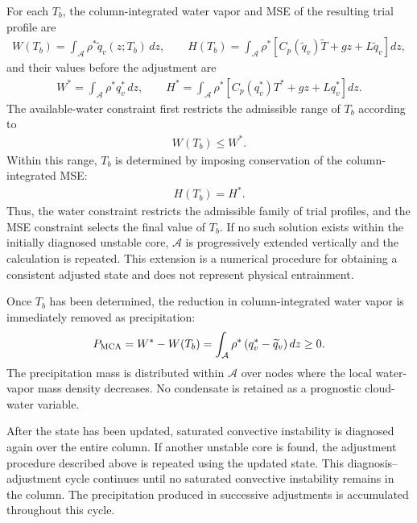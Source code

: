 For each $T_b$, the column-integrated water vapor and MSE of the resulting trial profile are
%
\begin{align*}
 W(T_b)
 =
 \int_{\mathcal{A}} \rho^* \widetilde{q}_v(z;T_b)\,dz ,
 \qquad
 H(T_b)
 =
 \int_{\mathcal{A}} \rho^*
 \left[
 C_p(\widetilde{q}_v)\widetilde{T}
 + gz
 + L\widetilde{q}_v
 \right] dz ,
\end{align*}
%
and their values before the adjustment are
%
\begin{align*}
 W^*
 =
 \int_{\mathcal{A}} \rho^* q_v^*\,dz ,
 \qquad
 H^*
 =
 \int_{\mathcal{A}} \rho^*
 \left[
 C_p(q_v^*)T^*
 + gz
 + Lq_v^*
 \right] dz .
\end{align*}
%
The available-water constraint first restricts the admissible range of $T_b$ according to
%
\begin{align}
 W(T_b) \le W^*.
 \label{eq:mca_water_constraint}
\end{align}
%
Within this range, $T_b$ is determined by imposing conservation of the column-integrated MSE:
%
\begin{align}
 H(T_b) = H^*.
 \label{eq:mca_energy_constraint}
\end{align}
%
Thus, the water constraint restricts the admissible family of trial profiles, and the MSE constraint selects the final value of $T_b$.
If no such solution exists within the initially diagnosed unstable core, $\mathcal{A}$ is progressively extended vertically and the calculation is repeated.
This extension is a numerical procedure for obtaining a consistent adjusted state and does not represent physical entrainment.

Once $T_b$ has been determined, the reduction in column-integrated water vapor is immediately removed as precipitation:
%
\begin{align}
 P_{\rm MCA}
 =
 W^* - W(T_b)
 =
 \int_{\mathcal{A}}
 \rho^*
 \left(q_v^*-\widetilde{q}_v\right) dz
 \ge 0.
 \label{eq:mca_precip}
\end{align}
%
The precipitation mass is distributed within $\mathcal{A}$ over nodes where the local water-vapor mass density decreases.
No condensate is retained as a prognostic cloud-water variable.


After the state has been updated, saturated convective instability is diagnosed again over the entire column.
If another unstable core is found, the adjustment procedure described above is repeated using the updated state.
This diagnosis--adjustment cycle continues until no saturated convective instability remains in the column.
The precipitation produced in successive adjustments is accumulated throughout this cycle.


